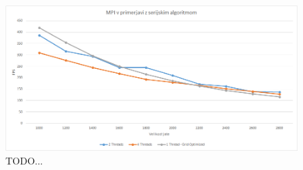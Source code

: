 \documentclass[a4paper, 12pt]{book}
\begin{document}
\begin{figure}[t]
\includegraphics[width=\textwidth]{graf_mpi}
\caption{TODO...}
\label{img:graf_mpi}
\centering
\end{figure}

\clearpage
{}


\end{document}
